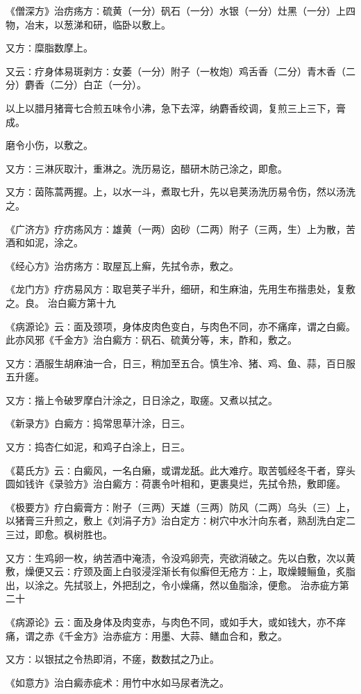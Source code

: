 \documentclass[a4paper,12pt,UTF8,twoside]{ctexbook}
\begin{document}
《僧深方》治疠疡方∶硫黄（一分）矾石（一分）水银（一分）灶黑（一分）上四物，冶末，以葱涕和研，临卧以敷上。

又方∶糜脂数摩上。

又云∶疗身体易斑剥方∶女萎（一分）附子（一枚炮）鸡舌香（二分）青木香（二分）麝香（二分）白芷（一分）。

以上以腊月猪膏七合煎五味令小沸，急下去滓，纳麝香绞调，复煎三上三下，膏成。

磨令小伤，以敷之。

又方∶三淋灰取汁，重淋之。洗历易讫，醋研木防己涂之，即愈。

又方∶茵陈蒿两握。上，以水一斗，煮取七升，先以皂荚汤洗历易令伤，然以汤洗之。

《广济方》疗疠疡风方∶雄黄（一两）囟砂（二两）附子（三两，生）上为散，苦酒和如泥，涂之。

《经心方》治疠疡方∶取屋瓦上癣，先拭令赤，敷之。

《龙门方》疗疠易风方∶取皂荚子半升，细研，和生麻油，先用生布揩患处，复敷之。良。
治白癜方第十九

《病源论》云∶面及颈项，身体皮肉色变白，与肉色不同，亦不痛痒，谓之白癜。此亦风邪《千金方》治白癜方∶矾石、硫黄分等，末，酢和，敷之。

又方∶酒服生胡麻油一合，日三，稍加至五合。慎生冷、猪、鸡、鱼、蒜，百日服五升瘥。

又方∶揩上令破罗摩白汁涂之，日日涂之，取瘥。又煮以拭之。

《新录方》白癜方∶捣常思草汁涂，日三。

又方∶捣杏仁如泥，和鸡子白涂上，日三。

《葛氏方》云∶白癜风，一名白癞，或谓龙舐。此大难疗。取苦瓠经冬干者，穿头圆如钱许《录验方》治白癜方∶荷裹令叶相和，更裹臭烂，先拭令热，敷即瘥。

《极要方》疗白癜膏方∶附子（三两）天雄（三两）防风（二两）乌头（三）上，以猪膏三升煎之，敷上《刘涓子方》治白定方∶树穴中水汁向东者，熟刮洗白定二三过，即愈。枫树胜也。

又方∶生鸡卵一枚，纳苦酒中淹渍，令没鸡卵壳，壳欲消破之。先以白敷，次以黄敷，燥便又云∶疗颈及面上白驳浸淫渐长有似癣但无疮方∶上，取燥鳗鲡鱼，炙脂出，以涂之。先拭驳上，外把刮之，令小燥痛，然以鱼脂涂，便愈。
治赤疵方第二十

《病源论》云∶面及身体及肉变赤，与肉色不同，或如手大，或如钱大，亦不痒痛，谓之赤《千金方》治赤疵方∶用墨、大蒜、鳝血合和，敷之。

又方∶以银拭之令热即消，不瘥，数数拭之乃止。

《如意方》治白癜赤疵术∶用竹中水如马尿者洗之。
\end{document}
